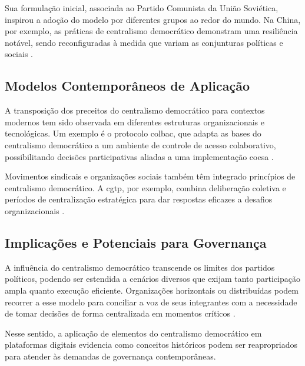 Sua formulação inicial, associada ao Partido Comunista da União
Soviética, inspirou a adoção do modelo por diferentes grupos ao redor
do mundo. Na China, por exemplo, as práticas de centralismo
democrático demonstram uma resiliência notável, sendo reconfiguradas à
medida que variam as conjunturas políticas e sociais
\cite{ACenturyofDemocraticCentralism}.

\subsection{Modelos Contemporâneos de Aplicação}
\label{sec:modelos_contemporaneos}

A transposição dos preceitos do centralismo democrático para contextos
modernos tem sido observada em diferentes estruturas organizacionais e
tecnológicas. Um exemplo é o protocolo \gls{colbac}, que adapta as
bases do centralismo democrático a um ambiente de controle de acesso
colaborativo, possibilitando decisões participativas aliadas a uma
implementação coesa \cite{Colbac}.

Movimentos sindicais e organizações sociais também
têm integrado princípios de centralismo democrático. A
\gls{cgtp}, por exemplo, combina deliberação coletiva e períodos de
centralização estratégica para dar respostas eficazes a desafios
organizacionais \cite{CGTPStatutes}.

\subsection{Implicações e Potenciais para Governança}
\label{sec:implicacoes_potenciais}

A influência do centralismo democrático transcende os limites dos
partidos políticos, podendo ser estendida a cenários diversos que
exijam tanto participação ampla quanto execução eficiente.
Organizações horizontais ou distribuídas podem recorrer a esse modelo
para conciliar a voz de seus integrantes com a necessidade de tomar
decisões de forma centralizada em momentos críticos
\cite{StillaCenturyoftheChineseModel,ACenturyofDemocraticCentralism}.

Nesse sentido, a aplicação de elementos do centralismo democrático em
plataformas digitais evidencia como conceitos históricos podem ser
reapropriados para atender às demandas de governança contemporâneas.